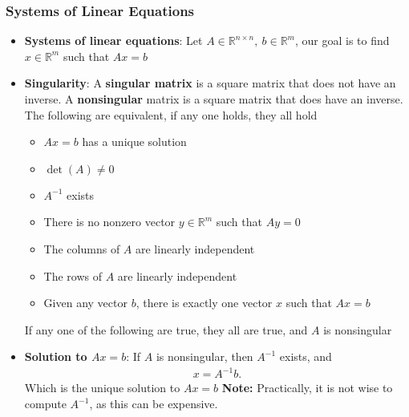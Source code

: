 \documentclass{report}
\begin{document}
    \pagebreak 
    \subsubsection{Systems of Linear Equations}
    \begin{itemize}
        \item \textbf{Systems of linear equations}: Let $A \in \mathbb{R}^{n\times n},\ b \in \mathbb{R}^{m}$, our goal is to find $x \in \mathbb{R}^{m}$ such that $Ax = b$
        \item \textbf{Singularity}: A \textbf{singular matrix} is a square matrix that does not have an inverse.
            \bigbreak \noindent 
            A \textbf{nonsingular} matrix is a square matrix that does have an inverse.
            \bigbreak \noindent 
            The following are equivalent, if any one holds, they all hold
            \begin{itemize}
                \item $Ax = b$ has a unique solution
                \item $\det(A)\ne 0$
                \item $A^{-1}$ exists
                \item There is no nonzero vector $y \in \mathbb{R}^{m}$ such that $Ay=0 $
                \item The columns of $A$ are linearly independent
                \item The rows of $A$ are linearly independent
                \item Given any vector $b$, there is exactly one vector $x$ such that $Ax=b$
            \end{itemize}
            If any one of the following are true, they all are true, and $A$ is nonsingular
        \item \textbf{Solution to $Ax = b$}: If $A$ is nonsingular, then $A^{-1}$ exists, and
            \begin{align*}
                x = A^{-1}b
            .\end{align*}
            Which is the unique solution to $Ax=b$
            \bigbreak \noindent 
            \textbf{Note:} Practically, it is not wise to compute $A^{-1}$, as this can be expensive.
    \end{itemize}

    \pagebreak 
\end{document}
